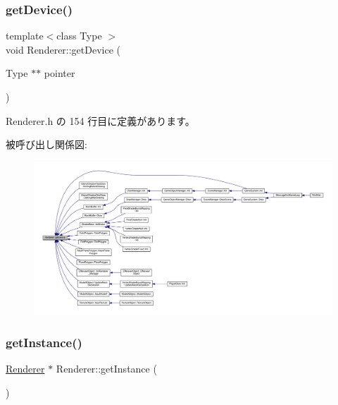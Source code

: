 \subsubsection{\texorpdfstring{get\+Device()}{getDevice()}}
{\footnotesize\ttfamily template$<$class Type $>$ \\
void Renderer\+::get\+Device (\begin{DoxyParamCaption}\item[{Type $\ast$$\ast$}]{pointer }\end{DoxyParamCaption})\hspace{0.3cm}{\ttfamily [inline]}}



 Renderer.\+h の 154 行目に定義があります。

被呼び出し関係図\+:
\nopagebreak
\begin{figure}[H]
\begin{center}
\leavevmode
\includegraphics[width=350pt]{class_renderer_a56662123051f8898c4e8e9d5457fd317_icgraph}
\end{center}
\end{figure}
\mbox{\label{class_renderer_ac1bf10ff8b4f967f0d416a26d482abd6}} 
\subsubsection{\texorpdfstring{get\+Instance()}{getInstance()}}
{\footnotesize\ttfamily \mbox{\hyperlink{class_renderer}{Renderer}} $\ast$ Renderer\+::get\+Instance (\begin{DoxyParamCaption}{ }\end{DoxyParamCaption})\hspace{0.3cm}{\ttfamily [static]}}



